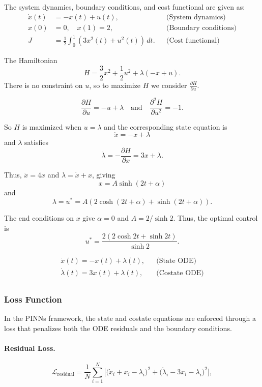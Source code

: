The system dynamics, boundary conditions, and cost functional are given as:
\begin{align*}
\dot{x}(t) &= -x(t) + u(t), && \text{(System dynamics)} \\
x(0) &= 0, \quad x(1) = 2, && \text{(Boundary conditions)} \\
J &= \frac{1}{2} \int_0^1 \left( 3x^2(t) + u^2(t) \right) \, dt. && \text{(Cost functional)}
\end{align*}

The Hamiltonian
\[
H = \frac{3}{2} x^2 + \frac{1}{2} u^2 + \lambda (-x + u).
\]
There is no constraint on $u$, so to maximize $H$ we consider $\frac{\partial H}{\partial u}$.

\[
\frac{\partial H}{\partial u} = -u + \lambda \quad \text{and} \quad \frac{\partial^2 H}{\partial u^2} = -1.
\]

So $H$ is maximized when $u = \lambda$ and the corresponding state equation is 
\[
\dot{x} = -x + \lambda
\]
and $\lambda$ satisfies 
\[
\dot{\lambda} = -\frac{\partial H}{\partial x} = 3x + \lambda.
\]

Thus, $\ddot{x} = 4x$ and $\lambda = \dot{x} + x$, giving 
\[
x = A \sinh(2t + \alpha)
\]
and 
\[
\lambda = u^* = A\left(2 \cosh(2t + \alpha) + \sinh(2t + \alpha)\right).
\]

The end conditions on $x$ give $\alpha = 0$ and $A = 2/\sinh 2$. Thus, the optimal control is 
\[
u^* = \frac{2(2 \cosh 2t + \sinh 2t)}{\sinh 2}.
\]

\begin{align*}
\dot{x}(t) = -x(t) + \lambda(t), && \text{(State ODE)}\\
\dot{\lambda}(t) = 3x(t) + \lambda(t), && \text{(Costate ODE)}\\
\end{align*}

\subsubsection*{Loss Function}

In the PINNs framework, the state and costate equations are enforced through a loss that penalizes both the ODE residuals and the boundary conditions.  

\paragraph{Residual Loss.}
\[
\mathcal{L}_{\text{residual}} = \frac{1}{N} \sum_{i=1}^{N} 
\Big[ \big( \dot{x}_i + x_i - \lambda_i \big)^2 
+ \big( \dot{\lambda}_i - 3x_i - \lambda_i \big)^2 \Big],
\]

